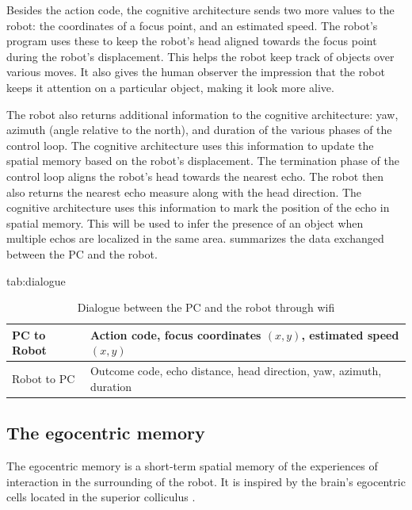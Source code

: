 \documentclass[pmlr]{jmlr}%
\begin{document}
Besides the action code, the cognitive architecture sends two more values to the robot: the coordinates of a focus point, and an estimated speed. 
The robot's program uses these to keep the robot's head aligned towards the focus point during the robot's displacement. 
This helps the robot keep track of objects over various moves. 
It also gives the human observer the impression that the robot keeps it attention on a particular object, making it look more alive. 

The robot also returns additional information to the cognitive architecture: yaw, azimuth (angle relative to the north), and duration of the various phases of the control loop. 
The cognitive architecture uses this information to update the spatial memory based on the robot's displacement. 
The termination phase of the control loop aligns the robot's head towards the nearest echo. 
The robot then also returns the nearest echo measure along with the head direction. 
The cognitive architecture uses this information to mark the position of the echo in spatial memory. 
This will be used to infer the presence of an object when multiple echos are localized in the same area. 
 summarizes the data exchanged between the PC and the robot.

\begin{table}[htbp]
	\floatconts
	{tab:dialogue}%
	{\caption{Dialogue between the PC and the robot through wifi}}%
	{\begin{tabular}{l|l}
			\toprule
			PC to Robot & Action code, focus coordinates $(x, y)$, estimated speed $(x, y)$\\
			\midrule
			Robot to PC & Outcome code, echo distance, head direction, yaw, azimuth, duration\\
			\bottomrule
	\end{tabular}}
\end{table}

\subsection{The egocentric memory}

The egocentric memory is a short-term spatial memory of the experiences of interaction in the surrounding of the robot. 
It is inspired by the brain's egocentric cells located in the superior colliculus \citep{grieves_representation_2017}.
\end{document}
